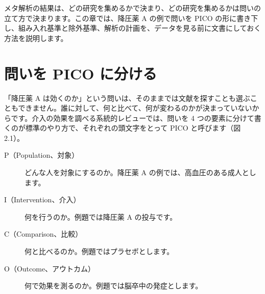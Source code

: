 \begin{chapintro}
メタ解析の結果は、どの研究を集めるかで決まり、どの研究を集めるかは問いの立て方で決まります。この章では、降圧薬 A の例で問いを PICO の形に書き下し、組み入れ基準と除外基準、解析の計画を、データを見る前に文書にしておく方法を説明します。
\end{chapintro}

\section{問いを PICO に分ける}
\label{sec:02-1}

「降圧薬 A は効くのか」という問いは、そのままでは文献を探すことも選ぶこともできません。誰に対して、何と比べて、何が変わるのかが決まっていないからです。介入の効果を調べる系統的レビューでは、問いを 4 つの要素に分けて書くのが標準のやり方で、それぞれの頭文字をとって PICO と呼びます（図 2.1）。

\begin{description}
\item[P（Population、対象）] どんな人を対象にするのか。降圧薬 A の例では、高血圧のある成人とします。
\item[I（Intervention、介入）] 何を行うのか。例題では降圧薬 A の投与です。
\item[C（Comparison、比較）] 何と比べるのか。例題ではプラセボとします。
\item[O（Outcome、アウトカム）] 何で効果を測るのか。例題では脳卒中の発症とします。
\end{description}

\begin{kkcenter}
\begin{kkfitpic}
\end{kkfitpic}
\end{kkcenter}

